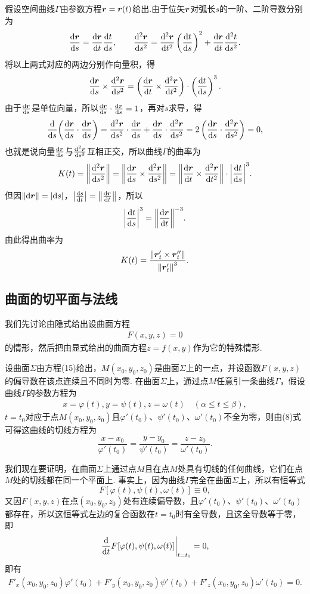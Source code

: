 假设空间曲线\(\Gamma\)由参数方程\(\boldsymbol{r} = \boldsymbol{r}(t)\)给出.由于位矢\(\boldsymbol{r}\)对弧长\(s\)的一阶、二阶导数分别为\[
\dv{\boldsymbol{r}}{s} = \dv{\boldsymbol{r}}{t} \dv{t}{s},
\qquad
\dv[2]{\boldsymbol{r}}{s} = \dv[2]{\boldsymbol{r}}{t} \left(\dv{t}{s}\right)^2 + \dv{\boldsymbol{r}}{t} \dv[2]{t}{s}.
\]将以上两式对应的两边分别作向量积，得\[
\dv{\boldsymbol{r}}{s} \times \dv[2]{\boldsymbol{r}}{s}
= \left(\dv{\boldsymbol{r}}{t} \times \dv[2]{\boldsymbol{r}}{t}\right) \cdot \left(\dv{t}{s}\right)^3.
\]由于\(\dv{\boldsymbol{r}}{s}\)是单位向量，所以\(\dv{\boldsymbol{r}}{s} \cdot \dv{\boldsymbol{r}}{s} = 1\)，再对\(s\)求导，得\[
\dv{s}( \dv{\boldsymbol{r}}{s} \cdot \dv{\boldsymbol{r}}{s} )
= \dv[2]{\boldsymbol{r}}{s} \cdot \dv{\boldsymbol{r}}{s} + \dv{\boldsymbol{r}}{s} \cdot \dv[2]{\boldsymbol{r}}{s}
= 2 \left( \dv{\boldsymbol{r}}{s} \cdot \dv[2]{\boldsymbol{r}}{s} \right)
= 0,
\]也就是说向量\(\dv{\boldsymbol{r}}{s}\)与\(\dv[2]{\boldsymbol{r}}{s}\)互相正交，所以曲线\(\Gamma\)的曲率为\[
K(t) = \norm{ \dv[2]{\boldsymbol{r}}{s} }
= \norm{ \dv{\boldsymbol{r}}{s} \times \dv[2]{\boldsymbol{r}}{s} }
= \norm{ \dv{\boldsymbol{r}}{t} \times \dv[2]{\boldsymbol{r}}{t} } \cdot \abs{ \dv{t}{s} }^3.
\]但因\(\norm{ \dd{\boldsymbol{r}} } = \abs{ \dd{s} }\)，\(\abs{ \dv{s}{t} } = \norm{ \dv{\boldsymbol{r}}{t} }\)，所以\[
\abs{ \dv{t}{s} }^3 = \norm{ \dv{\boldsymbol{r}}{t} }^{-3}.
\]由此得出曲率为\begin{equation}
K(t) = \frac{ \norm{ \boldsymbol{r}'_t \times \boldsymbol{r}''_t } }{ \norm{ \boldsymbol{r}'_t }^3 }.
\end{equation}

\subsection{曲面的切平面与法线}
我们先讨论由隐式给出设曲面方程\begin{gather}
F(x,y,z)=0
\tag{15}
\end{gather}的情形，然后把由显式给出的曲面方程\(z = f(x,y)\)作为它的特殊情形.

设曲面\(\Sigma\)由方程(15)给出，\(M(x_0,y_0,z_0)\)是曲面\(\Sigma\)上的一点，并设函数\(F(x,y,z)\)的偏导数在该点连续且不同时为零.
在曲面\(\Sigma\)上，通过点\(M\)任意引一条曲线\(\Gamma\)，假设曲线\(\Gamma\)的参数方程为\begin{gather}
x = \varphi(t),
y = \psi(t),
z = \omega(t)
\quad (\alpha \leq t \leq \beta),
\tag{16}
\end{gather}
\(t = t_0\)对应于点\(M(x_0,y_0,z_0)\)且\(\varphi'(t_0)\)、\(\psi'(t_0)\)、\(\omega'(t_0)\)不全为零，则由(8)式可得这曲线的切线方程为\[
\frac{x-x_0}{\varphi'(t_0)}
=\frac{y-y_0}{\psi'(t_0)}
=\frac{z-z_0}{\omega'(t_0)}.
\]

我们现在要证明，在曲面\(\Sigma\)上通过点\(M\)且在点\(M\)处具有切线的任何曲线，它们在点\(M\)处的切线都在同一个平面上.
事实上，因为曲线\(\Gamma\)完全在曲面\(\Sigma\)上，所以有恒等式\[
F[\varphi(t),\psi(t),\omega(t)] \equiv 0,
\]又因\(F(x,y,z)\)在点\((x_0,y_0,z_0)\)处有连续偏导数，且\(\varphi'(t_0)\)、\(\psi'(t_0)\)、\(\omega'(t_0)\)都存在，所以这恒等式左边的复合函数在\(t = t_0\)时有全导数，且这全导数等于零，即\[
\eval{\dv{t} F[\varphi(t),\psi(t),\omega(t)]}_{t=t_0} = 0,
\]即有\begin{gather}
F'_x(x_0,y_0,z_0) \varphi'(t_0)
+ F'_y(x_0,y_0,z_0) \psi'(t_0)
+ F'_z(x_0,y_0,z_0) \omega'(t_0)
= 0.
\tag{17}
\end{gather}

